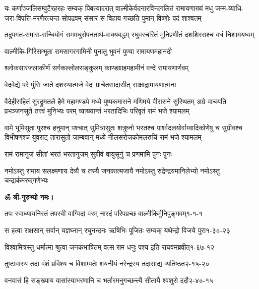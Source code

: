 \resetShloka

\fourlineindentedshloka
{यः कर्णाञ्जलिसम्पुटैरहरहः सम्यक् पिबत्यादरात्}
{वाल्मीकेर्वदनारविन्दगलितं रामायणाख्यं मधु}
{जन्म-व्याधि-जरा-विपत्ति-मरणैरत्यन्त-सोपद्रवम्}
{संसारं स विहाय गच्छति पुमान् विष्णोः पदं शाश्वतम्}

\twolineshloka
{तदुपगत-समास-सन्धियोगं सममधुरोपनतार्थ-वाक्यबद्धम्}
{रघुवरचरितं मुनिप्रणीतं दशशिरसश्च वधं निशामयध्वम्}

\twolineshloka
{वाल्मीकि-गिरिसम्भूता रामसागरगामिनी}
{पुनातु भुवनं पुण्या रामायणमहानदी}

\twolineshloka
{श्लोकसारजलाकीर्णं सर्गकल्लोलसङ्कुलम्}
{काण्डग्राहमहामीनं वन्दे रामायणार्णवम्}

\twolineshloka
{वेदवेद्ये परे पुंसि जाते दशरथात्मजे}
{वेदः प्राचेतसादासीत् साक्षाद्रामायणात्मना}

\resetShloka
{}

\fourlineindentedshloka
{वैदेहीसहितं सुरद्रुमतले हैमे महामण्डपे}
{मध्ये पुष्पकमासने मणिमये वीरासने सुस्थितम्}
{अग्रे वाचयति प्रभञ्जनसुते तत्त्वं मुनिभ्यः परम्}
{व्याख्यान्तं भरतादिभिः परिवृतं रामं भजे श्यामलम्}

\fourlineindentedshloka
{वामे भूमिसुता पुरश्च हनुमान् पश्चात् सुमित्रासुतः}
{शत्रुघ्नो भरतश्च पार्श्वदलयोर्वाय्वादिकोणेषु च}
{सुग्रीवश्च विभीषणश्च युवराट् तारासुतो जाम्बवान्}
{मध्ये नीलसरोजकोमलरुचिं रामं भजे श्यामलम्}

\twolineshloka
{रामं रामानुजं सीतां भरतं भरतानुजम्}
{सुग्रीवं वायुसूनुं च प्रणमामि पुनः पुनः}

\twolineshloka
{नमोऽस्तु रामाय सलक्ष्मणाय देव्यै च तस्यै जनकात्मजायै}
{नमोऽस्तु रुद्रेन्द्रयमानिलेभ्यो नमोऽस्तु चन्द्रार्कमरुद्गणेभ्यः}

\centerline{\textbf{ॐ श्री-गुरुभ्यो नमः।}}

\resetShloka
{}
\annotwolineshloka
{तपः स्वाध्यायनिरतं तपस्वी वाग्विदां वरम्}
{नारदं परिपप्रच्छ वाल्मीकिर्मुनिपुङ्गवम्}{१-१-१}

\annotwolineshloka
{स हत्वा राक्षसान् सर्वान् यज्ञघ्नान् रघुनन्दनः}
{ऋषिभिः पूजितः सम्यक् यथेन्द्रो विजये पुरा}{१-३०-२३}

\annotwolineshloka
{विश्वामित्रस्तु धर्मात्मा श्रुत्वा जनकभाषितम्}
{वत्स राम धनुः पश्य इति राघवमब्रवीत्}{१-६७-१२}

\annotwolineshloka
{तुष्टावास्य तदा वंशं  प्रविश्य च विशाम्पतेः}
{शयनीयं नरेन्द्रस्य तदासाद्य व्यतिष्ठत}{२-१५-२०}

\annotwolineshloka
{वनवासं हि सङ्ख्याय वासांस्याभरणानि च}
{भर्तारमनुगच्छन्त्यै सीतायै श्वशुरो ददौ}{२-४०-१५}

